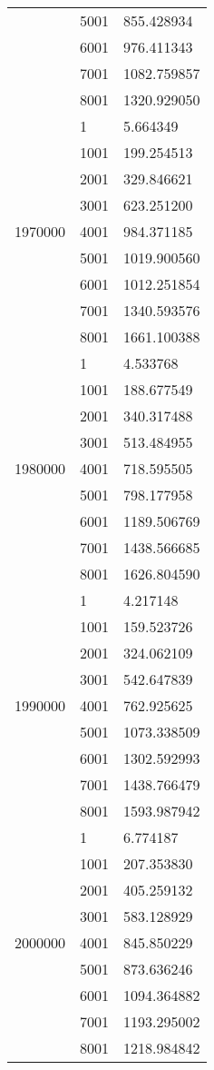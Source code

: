 \begin{table}[htb!]
\begin{tabular}{lll}
 & 5001 & 855.428934 \\
 & 6001 & 976.411343 \\
 & 7001 & 1082.759857 \\
 & 8001 & 1320.929050 \\
\multirow[c]{9}{*}{1970000} & 1 & 5.664349 \\
 & 1001 & 199.254513 \\
 & 2001 & 329.846621 \\
 & 3001 & 623.251200 \\
 & 4001 & 984.371185 \\
 & 5001 & 1019.900560 \\
 & 6001 & 1012.251854 \\
 & 7001 & 1340.593576 \\
 & 8001 & 1661.100388 \\
\multirow[c]{9}{*}{1980000} & 1 & 4.533768 \\
 & 1001 & 188.677549 \\
 & 2001 & 340.317488 \\
 & 3001 & 513.484955 \\
 & 4001 & 718.595505 \\
 & 5001 & 798.177958 \\
 & 6001 & 1189.506769 \\
 & 7001 & 1438.566685 \\
 & 8001 & 1626.804590 \\
\multirow[c]{9}{*}{1990000} & 1 & 4.217148 \\
 & 1001 & 159.523726 \\
 & 2001 & 324.062109 \\
 & 3001 & 542.647839 \\
 & 4001 & 762.925625 \\
 & 5001 & 1073.338509 \\
 & 6001 & 1302.592993 \\
 & 7001 & 1438.766479 \\
 & 8001 & 1593.987942 \\
\multirow[c]{9}{*}{2000000} & 1 & 6.774187 \\
 & 1001 & 207.353830 \\
 & 2001 & 405.259132 \\
 & 3001 & 583.128929 \\
 & 4001 & 845.850229 \\
 & 5001 & 873.636246 \\
 & 6001 & 1094.364882 \\
 & 7001 & 1193.295002 \\
 & 8001 & 1218.984842 \\

\end{tabular}
\end{table}
